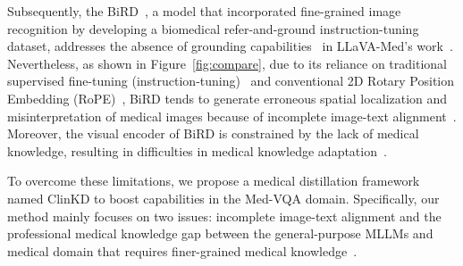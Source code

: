 Subsequently, the BiRD~\cite{huang2024BiRD}, a model that incorporated fine-grained image recognition by developing a biomedical refer-and-ground instruction-tuning dataset, addresses the absence of grounding capabilities~\cite{you2023ferretrefergroundgranularity, zhang2024ferretv2improvedbaselinereferring} in LLaVA-Med's work~\cite{li2024llava}. Nevertheless, as shown in Figure~\ref{fig:compare}, due to its reliance on traditional supervised fine-tuning (instruction-tuning)~\cite{sft1, sft2, sft3} and conventional 2D Rotary Position Embedding (RoPE)~\cite{su2023roformerenhancedtransformerrotary}, BiRD tends to generate erroneous spatial localization and misinterpretation of medical images because of incomplete image-text alignment~\cite{alignment1, alignment2}. Moreover, the visual encoder of BiRD is constrained by the lack of medical knowledge, resulting in difficulties in medical knowledge adaptation~\cite{adaptation, lin2025healthgptmedicallargevisionlanguage}.


To overcome these limitations, we propose a medical distillation framework named ClinKD to boost capabilities in the Med-VQA domain. Specifically, our method mainly focuses on two issues: incomplete image-text alignment and the professional medical knowledge gap between the general-purpose MLLMs and medical domain that requires finer-grained medical knowledge~\cite{medical_fine-grained, zeng2024visualorientedfinegrainedknowledgeediting}.


